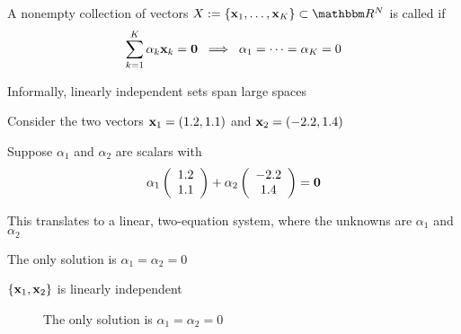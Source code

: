 \begin{frame}

    \vspace{2em}
   

    A nonempty collection of vectors $X := \{\boldx_1,\ldots, \boldx_K\}
    \subset \RR^N$ is called  if
    \begin{equation*}
        \sum_{k=1}^K \alpha_k {\mathbf x}_k
         = {\mathbf 0} 
        \; \implies \;
        \alpha_1 = \cdots = \alpha_K = 0
    \end{equation*}

    \vspace{1em}
    
    Informally, linearly independent sets span large spaces

\end{frame}


\begin{frame}
    
    \vspace{2em}
    \Eg 
    Consider the two vectors ${\mathbf x}_1 = (1.2, 1.1)$ and ${\mathbf x}_2 = (-2.2, 1.4)$
    
    Suppose $\alpha_1$ and $\alpha_2$ are scalars with
    \begin{equation*}
        \alpha_1
        \left(
        \begin{array}{c}
            1.2 \\
            1.1
        \end{array}
        \right)
        + 
        \alpha_2
        \left(
        \begin{array}{c}
            -2.2 \\
            1.4
        \end{array}
        \right)
        =
        {\mathbf 0}
    \end{equation*}
    
    This translates to a linear, two-equation system, where the unknowns
    are $\alpha_1$ and $\alpha_2$ 
    
    The only solution is $\alpha_1 = \alpha_2 = 0$
    
    $\{{\mathbf x}_1, {\mathbf x}_2\}$ is linearly independent


\end{frame}

    \begin{frame}
        \begin{figure}
       \begin{center}
           \caption{\label{f:alpha_eq} The only solution is $\alpha_1 = \alpha_2 = 0$}
       \end{center}
    \end{figure}

\end{frame}

